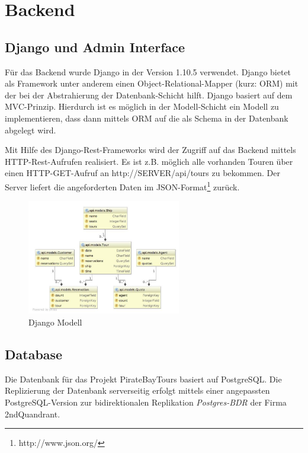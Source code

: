 \documentclass[12pt,a4paper,ngerman,english]{report}
\begin{document}
\section{Backend}
\subsection{Django und Admin Interface}
Für das Backend wurde Django in der Version 1.10.5 verwendet. Django bietet als Framework unter anderem einen Object-Relational-Mapper (kurz: ORM) mit der bei der Abstrahierung der Datenbank-Schicht hilft. Django basiert auf dem MVC-Prinzip. Hierdurch ist es möglich in der Modell-Schicht ein Modell zu implementieren, dass dann mittels ORM auf die als Schema in der Datenbank abgelegt wird. 

Mit Hilfe des  Django-Rest-Frameworks wird der Zugriff auf das Backend mittels HTTP-Rest-Aufrufen realisiert. Es ist z.B. möglich alle vorhanden Touren über einen HTTP-GET-Aufruf an http://SERVER/api/tours  zu bekommen. Der Server liefert die angeforderten Daten im JSON-Format\footnote{http://www.json.org/} zurück.

\begin{figure}[h]
	\centering
	\includegraphics[width=0.6\textwidth]{img/django-modell.png}
	\caption{Django Modell}
	\label{fig:django-modell}
\end{figure}

\subsection{Database}

Die Datenbank für das Projekt PirateBayTours basiert auf PostgreSQL. Die Replizierung der Datenbank serverseitig erfolgt mittels einer angepassten PostgreSQL-Version zur bidirektionalen Replikation \textit{Postgres-BDR} der Firma 2ndQuandrant.
\end{document}
